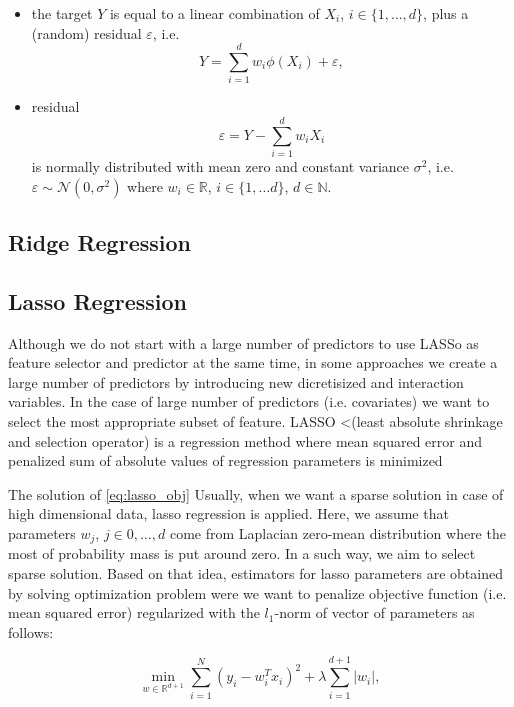 \documentclass{article}
\begin{document}
\begin{itemize}
  \item the target $Y$ is equal to a linear combination of $X_i$, $i\in\{1,\ldots, d\}$, plus a (random) residual $\varepsilon$, i.e.
  \begin{equation}
    Y = \sum_{i=1}^d w_i \phi(X_i) + \varepsilon,
  \end{equation}
  \item residual $$\varepsilon = Y - \sum_{i=1}^d w_iX_i $$
  is normally distributed with mean zero and constant variance $\sigma^2$, i.e. $\varepsilon\sim \mathcal{N}(0,\sigma^2)$ where $w_i\in\mathbb{R}$, $i\in\{1,\ldots d\}$, $d\in \mathbb{N}$.
\end{itemize}



\subsection{Ridge Regression}
\subsection{Lasso Regression}
Although we do not start with a large number of predictors to use LASSo as feature selector and predictor at the same time, in some approaches we create a large number of predictors by introducing new dicretisized and interaction variables. In the case of large number of predictors (i.e. covariates) we want to select the most appropriate subset of feature. LASSO \cite{tibshiraniRegressionShrinkageSelection1996} <(least absolute shrinkage and selection operator) is a regression method where mean squared error and penalized sum of absolute values of regression parameters is minimized



The solution of \ref{eq:lasso_obj}
Usually, when we want a sparse solution in case of high dimensional data, lasso regression is applied. Here, we assume that parameters $w_j$, $j\in {0,\ldots, d}$ come from Laplacian zero-mean distribution where the most of probability mass is put around zero. In a such way, we aim to select sparse solution. Based on that idea, estimators for lasso parameters are obtained by solving optimization problem were we want to penalize objective function (i.e. mean squared error) regularized with the $l_1$-norm of vector of parameters as follows:

\begin{equation}\label{eq:lasso_obj}
  \min_{w\in \mathbb{R}^{d+1}} \sum_{i=1}^N(y_i-w_i^Tx_i)^2 + \lambda\sum_{i=1}^{d+1}|w_i|,
\end{equation}
\end{document}
